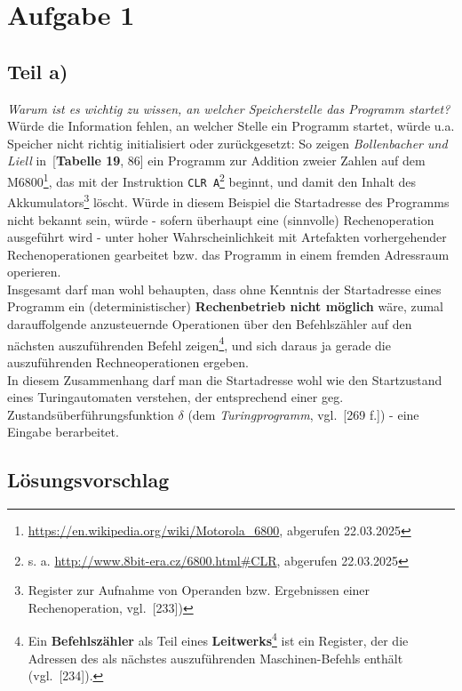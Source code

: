 \chapter{Aufgabe 1}

\section{Teil a)}

\textit{Warum ist es wichtig zu wissen, an welcher Speicherstelle das Programm startet?}\\

\noindent
Würde die Information fehlen, an welcher Stelle ein Programm startet,  würde u.a. Speicher nicht richtig initialisiert oder zurückgesetzt: So zeigen \textit{Bollenbacher und Liell} in~\cite{BL21}[\textbf{Tabelle 19}, 86] ein Programm zur Addition zweier Zahlen auf dem M6800\footnote{
\url{https://en.wikipedia.org/wiki/Motorola_6800}, abgerufen 22.03.2025
}, das mit der Instruktion \texttt{CLR A}\footnote{
s. a. \url{http://www.8bit-era.cz/6800.html#CLR}, abgerufen 22.03.2025
} beginnt, und damit den Inhalt des  Akkumulators\footnote{
Register zur Aufnahme von Operanden bzw. Ergebnissen einer Rechenoperation, vgl.~\cite{Fri21}[233])
} löscht.
Würde in diesem Beispiel die Startadresse des Programms nicht bekannt sein, würde - sofern überhaupt eine (sinnvolle) Rechenoperation ausgeführt wird - unter hoher Wahrscheinlichkeit mit Artefakten vorhergehender Rechenoperationen gearbeitet bzw. das Programm in einem fremden Adressraum operieren.\\

\noindent
Insgesamt darf man wohl behaupten, dass ohne Kenntnis der Startadresse eines Programm ein (deterministischer) \textbf{Rechenbetrieb nicht möglich} wäre, zumal darauffolgende anzusteuernde Operationen über den Befehlszähler auf den nächsten auszuführenden Befehl zeigen\footnote{
Ein \textbf{Befehlszähler} als Teil eines \textbf{Leitwerks}\footnote{
    hier insb. bei der Von-Neumann-Rechnerarchitektur
} ist ein Register, der die Adressen des als nächstes auszuführenden Maschinen-Befehls enthält (vgl.~\cite{Fri21}[234]).
}, und sich daraus ja gerade die auszuführenden Rechneoperationen ergeben.\\

\noindent
In diesem Zusammenhang darf man die Startadresse wohl wie den Startzustand eines Turingautomaten verstehen, der entsprechend einer geg. Zustandsüberführungsfunktion $\delta$ (dem \textit{Turingprogramm}, vgl.~\cite{VW16h}[269 f.]) - eine Eingabe berarbeitet.

\section{Lösungsvorschlag}
